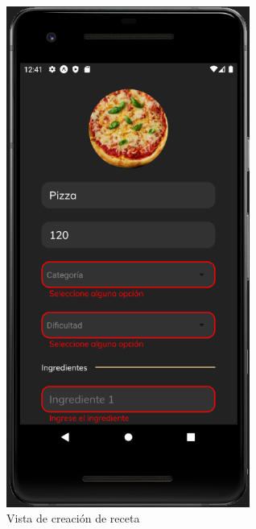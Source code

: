 \begin{figure}[!h]
  \centering
  \includegraphics[width=8cm, scale=1]{Images/Imagenes/add4.png}
  \caption{Vista de creación de receta}
  \label{fig:add4}
\end{figure}

